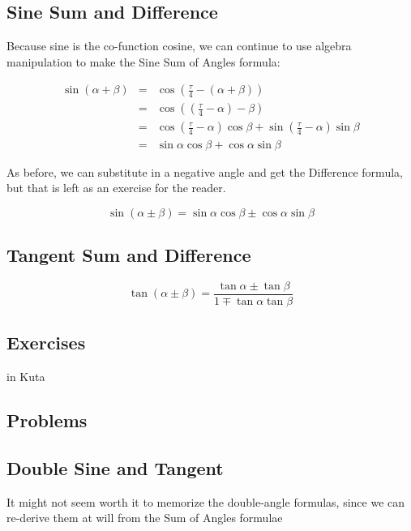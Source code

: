 \subsection{Sine Sum and Difference}
Because sine is the co-function cosine, we can continue to use algebra manipulation to make
the Sine Sum of Angles formula:

\begin{align*}
\sin(\alpha+\beta) &=& \cos\left(\frac{\tau}{4} - (\alpha + \beta)\right)\\
&=& \cos\left(\left(\frac{\tau}{4} - \alpha\right) - \beta\right)\\
&=& \cos\left(\frac{\tau}{4} - \alpha\right)\cos\beta + \sin\left(\frac{\tau}{4} - \alpha\right)\sin\beta\\
&=& \sin\alpha\cos\beta + \cos\alpha\sin\beta
\end{align*}

As before, we can substitute in a negative angle and get the Difference formula, but
that is left as an exercise for the reader.

\begin{equation}
\sin(\alpha \pm \beta) = \sin\alpha\cos\beta \pm \cos\alpha\sin\beta
\end{equation}

\subsection{Tangent Sum and Difference}

\begin{equation}
\tan(\alpha \pm \beta) = \frac{\tan\alpha \pm \tan\beta}{1 \mp \tan\alpha\tan\beta}
\end{equation}

\newpage
\subsection{Exercises}
in Kuta


{}
\subsection{Problems}
\noindent{}
\subsection{Double Sine and Tangent}
It might not seem worth it to memorize the double-angle formulas, since we can re-derive them
at will from the Sum of Angles formulae

